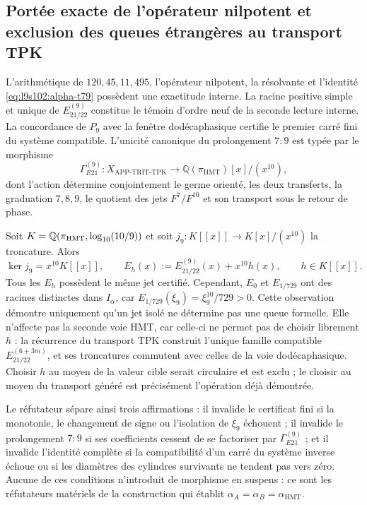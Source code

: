 \subsection{Portée exacte de l'opérateur nilpotent et exclusion des queues étrangères au transport TPK}
\label{sec:l9s102:alpha-alcance}

L'arithmétique de \(120,45,11,495\), l'opérateur nilpotent, la résolvante et
l'identité \cref{eq:l9s102:alpha-t79} possèdent une exactitude interne. La racine
positive simple et unique de \(E_{21/22}^{(9)}\) constitue le témoin d'ordre
neuf de la seconde lecture interne. La concordance de \(P_9\) avec la
fenêtre dodécaphasique certifie le premier carré fini du système
compatible. L'unicité canonique du prolongement \(7{:}9\) est typée
par le morphisme
\begin{equation}
 \Gamma_{E21}^{(9)}:
 X_{\mathrm{APP\text{-}TRIT\text{-}TPK}}
 \longrightarrow \mathbb Q(\pi_{\mathrm{HMT}})[x]/(x^{10}),
 \label{eq:l9s102:alpha-gamma-e21}
\end{equation}
dont l'action détermine conjointement le germe orienté, les deux
transferts, la graduation \(7,8,9\), le quotient des jets
\(F^7/F^{10}\) et son transport sous le retour de phase.

Soit \(K=\mathbb Q(\pi_{\rm HMT},\log_{10}(10/9))\) et soit
\(j_9:K[[x]]\to K[x]/(x^{10})\) la troncature. Alors
\begin{equation}
 \ker j_9=x^{10}K[[x]],
 \qquad
 E_h(x):=E_{21/22}^{(9)}(x)+x^{10}h(x),
 \qquad h\in K[[x]].
\label{eq:l9s102:alpha-limite-jets-e21}
\end{equation}
Tous les \(E_h\) possèdent le même jet certifié. Cependant,
\(E_0\) et \(E_{1/729}\) ont des racines distinctes dans \(I_\alpha\), car
\(E_{1/729}(\xi_9)=\xi_9^{10}/729>0\). Cette observation démontre uniquement
qu'un jet isolé ne détermine pas une queue formelle. Elle n'affecte pas la seconde voie
HMT, car celle-ci ne permet pas de choisir librement \(h\) : la récurrence du
transport TPK construit l'unique famille compatible
\(E_{21/22}^{(6+3m)}\), et ses troncatures commutent avec celles de la voie
dodécaphasique. Choisir \(h\) au moyen de la valeur cible serait circulaire et est
exclu ; le choisir au moyen du transport généré est précisément
l'opération déjà démontrée.

Le réfutateur sépare ainsi trois affirmations : il invalide le certificat fini si
la monotonie, le changement de signe ou l'isolation de \(\xi_9\) échouent ;
il invalide le prolongement \(7{:}9\) si ses coefficients cessent de se factoriser par
\(\Gamma_{E21}^{(9)}\) ; et il invalide l'identité complète si la
compatibilité d'un carré du système inverse échoue ou si les diamètres des
cylindres survivants ne tendent pas vers zéro. Aucune de ces conditions
n'introduit de morphisme en suspens : ce sont les réfutateurs matériels de la
construction qui établit
\(\alpha_A=\alpha_B=\alpha_{\mathrm{HMT}}\).
